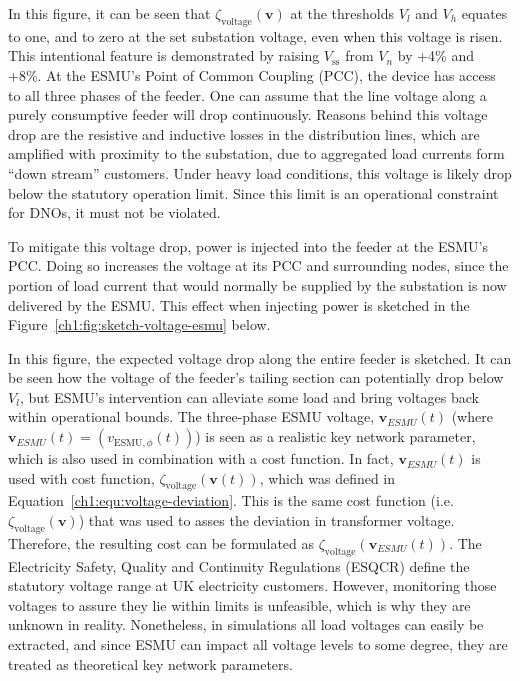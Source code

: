 

In this figure, it can be seen that $\zeta_\text{voltage}(\textbf{v})$ at the thresholds $V_l$ and $V_h$ equates to one, and to zero at the set substation voltage, even when this voltage is risen.
This intentional feature is demonstrated by raising $V_\text{ss}$ from $V_n$ by +4\% and +8\%.
At the ESMU's Point of Common Coupling (PCC), the device has access to all three phases of the feeder.
One can assume that the line voltage along a purely consumptive feeder will drop continuously.
Reasons behind this voltage drop are the resistive and inductive losses in the distribution lines, which are amplified with proximity to the substation, due to aggregated load currents form ``down stream'' customers.
Under heavy load conditions, this voltage is likely drop below the statutory operation limit.
Since this limit is an operational constraint for DNOs, it must not be violated.

To mitigate this voltage drop, power is injected into the feeder at the ESMU's PCC.
Doing so increases the voltage at its PCC and surrounding nodes, since the portion of load current that would normally be supplied by the substation is now delivered by the ESMU.
This effect when injecting power is sketched in the Figure~\ref{ch1:fig:sketch-voltage-esmu} below.




In this figure, the expected voltage drop along the entire feeder is sketched. 
It can be seen how the voltage of the feeder's tailing section can potentially drop below $V_l$, but ESMU's intervention can alleviate some load and bring voltages back within operational bounds.
The three-phase ESMU voltage, $\textbf{v}_{ESMU}(t)$ (where $\textbf{v}_{ESMU}(t) = (v_{\text{ESMU},\phi}(t))$) is seen as a realistic key network parameter, which is also used in combination with a cost function.
In fact, $\textbf{v}_{ESMU}(t)$ is used with cost function, $\zeta_\text{voltage}(\textbf{v}(t))$, which was defined in Equation~\ref{ch1:equ:voltage-deviation}.
This is the same cost function (i.e. $\zeta_\text{voltage}(\textbf{v})$) that was used to asses the deviation in transformer voltage.
Therefore, the resulting cost can be formulated as $\zeta_\text{voltage}(\textbf{v}_{ESMU}(t))$.
The Electricity Safety, Quality and Continuity Regulations (ESQCR) define the statutory voltage range at UK electricity customers.
However, monitoring those voltages to assure they lie within limits is unfeasible, which is why they are unknown in reality.
Nonetheless, in simulations all load voltages can easily be extracted, and since ESMU can impact all voltage levels to some degree, they are treated as theoretical key network parameters.

